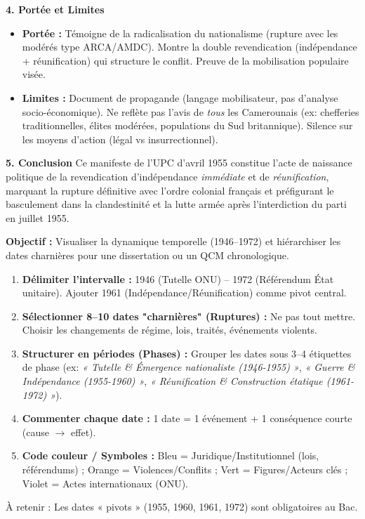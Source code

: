 \documentclass[11pt]{article}
\newcommand{\cle}[1]{{\popxbold\color{popdark}#1}}
\begin{document}
\begin{exoresolu}
\textbf{4. Portée et Limites}
\begin{itemize}
    \item \textbf{Portée :} Témoigne de la radicalisation du nationalisme (rupture avec les modérés type ARCA/AMDC). Montre la double revendication (indépendance + réunification) qui structure le conflit. Preuve de la mobilisation populaire visée.
    \item \textbf{Limites :} Document de propagande (langage mobilisateur, pas d'analyse socio-économique). Ne reflète pas l'avis de \emph{tous} les Camerounais (ex: chefferies traditionnelles, élites modérées, populations du Sud britannique). Silence sur les moyens d'action (légal vs insurrectionnel).
\end{itemize}

\textbf{5. Conclusion}
Ce manifeste de l'UPC d'avril 1955 constitue l'acte de naissance politique de la revendication d'indépendance \emph{immédiate} et de \emph{réunification}, marquant la rupture définitive avec l'ordre colonial français et préfigurant le basculement dans la clandestinité et la lutte armée après l'interdiction du parti en juillet 1955.
\end{exoresolu}

\begin{methode}
\textbf{Objectif :} Visualiser la dynamique temporelle (1946--1972) et hiérarchiser les dates charnières pour une dissertation ou un QCM chronologique.
\begin{enumerate}
    \item \textbf{Délimiter l'intervalle :} 1946 (Tutelle ONU) -- 1972 (Référendum État unitaire). Ajouter 1961 (Indépendance/Réunification) comme pivot central.
    \item \textbf{Sélectionner 8--10 dates "charnières" (Ruptures) :} Ne pas tout mettre. Choisir les changements de régime, lois, traités, événements violents.
    \item \textbf{Structurer en périodes (Phases) :} Grouper les dates sous 3--4 étiquettes de phase (ex: \textit{« Tutelle \& Émergence nationaliste (1946-1955) »}, \textit{« Guerre \& Indépendance (1955-1960) »}, \textit{« Réunification \& Construction étatique (1961-1972) »}).
    \item \textbf{Commenter chaque date :} 1 date = 1 événement + 1 conséquence courte (cause $\rightarrow$ effet).
    \item \textbf{Code couleur / Symboles :} \textcolor{popblue}{Bleu} = Juridique/Institutionnel (lois, référendums) ; \textcolor{poporange}{Orange} = Violences/Conflits ; \textcolor{popgreen}{Vert} = Figures/Acteurs clés ; \textcolor{poppurple}{Violet} = Actes internationaux (ONU).
\end{enumerate}
\cle{À retenir :} Les dates « pivots » (1955, 1960, 1961, 1972) sont obligatoires au Bac.
\end{methode}
\end{document}
